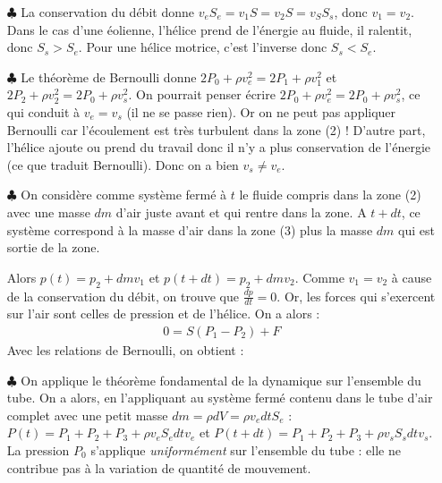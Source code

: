 \documentclass{report}
\begin{document}
\begin{itemize}
	
	\item[$\clubsuit$] La conservation du débit donne $v_eS_e=v_1S=v_2S=v_SS_s$, donc $v_1=v_2$. Dans le cas d'une éolienne, l'hélice prend de l'énergie au fluide, il ralentit, donc $S_s>S_e$. Pour une hélice motrice, c'est l'inverse donc $S_s<S_e$.
	
	\item[$\clubsuit$] Le théorème de Bernoulli donne $2P_0+\rho v_e^2=2P_1+\rho v_1^2$ et $2P_2+\rho v_2^2=2P_0+\rho v_s^2$. On pourrait penser écrire $2P_0+\rho v_e^2=2P_0+\rho v_s^2$, ce qui conduit à $v_e=v_s$ (il ne se passe rien). Or on ne peut pas appliquer Bernoulli car l'écoulement est très turbulent dans la zone (2) ! D'autre part, l'hélice ajoute ou prend du travail donc il n'y a plus conservation de l'énergie (ce que traduit Bernoulli). Donc on a bien $v_s\neq v_e$.
	
	\item[$\clubsuit$] On considère comme système fermé à $t$ le fluide compris dans la zone (2) avec une masse $dm$ d'air juste avant et qui rentre dans la zone. A $t+dt$, ce système correspond à la masse d'air dans la zone (3) plus la masse $dm$ qui est sortie de la zone. 
	
	Alors $p(t)=p_2+dmv_1$ et $p(t+dt)=p_2+dmv_2$. Comme $v_1=v_2$ à cause de la conservation du débit, on trouve que $\frac{dp}{dt}=0$.  Or, les forces qui s'exercent sur l'air sont celles de pression et de l'hélice. On a alors :
	\begin{align*}
		0=S(P_1-P_2)+F
	\end{align*}
	Avec les relations de Bernoulli, on obtient :
	
	\noindent{}
	
	\item[$\clubsuit$] On applique le théorème fondamental de la dynamique sur l'ensemble du tube. On a alors, en l'appliquant au système fermé contenu dans le tube d'air complet avec une petit masse $dm=\rho dV=\rho v_e dt S_e$ : $P(t)=P_1+P_2+P_3+\rho v_e S_e dtv_e$ et $P(t+dt)=P_1+P_2+P_3+\rho v_s S_s dtv_s$. La pression $P_0$ s'applique \textit{uniformément} sur l'ensemble du tube : elle ne contribue pas à la variation de quantité de mouvement. 
	
	\noindent{}
	

\end{itemize}
\end{document}
